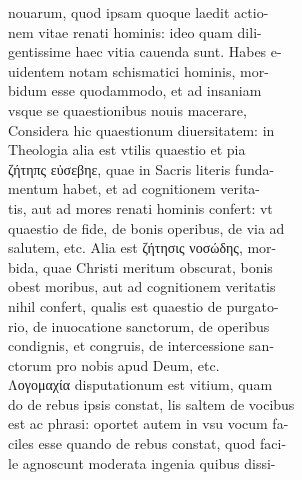 \documentclass{article}
\begin{document}
\begin{pages}
                nouarum, quod ipsam quoque laedit actio- \\
                nem vitae renati hominis: ideo quam dili- \\
                gentissime haec vitia cauenda sunt. Habes e- \\
                uidentem notam schismatici hominis, mor- \\
                bidum esse quodammodo, et ad insaniam \\
                vsque se quaestionibus nouis macerare, \\
                Considera hic quaestionum diuersitatem: in \\
                Theologia alia est vtilis quaestio et pia \\
                ζήτηπς εὐσεβηε, quae in Sacris literis funda- \\
                mentum habet, et ad cognitionem verita- \\
                tis, aut ad mores renati hominis confert: vt \\
                quaestio de fide, de bonis operibus, de via ad \\
                salutem, etc. Alia est ζήτησις νοσώδης, mor- \\
                bida, quae Christi meritum obscurat, bonis \\
                obest moribus, aut ad cognitionem veritatis \\
                nihil confert, qualis est quaestio de purgato- \\
                rio, de inuocatione sanctorum, de operibus \\
                condignis, et congruis, de intercessione san- \\
                ctorum pro nobis apud Deum, etc. \\
                Λογομαχία disputationum est vitium, quam \\
                do de rebus ipsis constat, lis saltem de vocibus \\
                est ac phrasi: oportet autem in vsu vocum fa- \\
                ciles esse quando de rebus constat, quod faci- \\
                le agnoscunt moderata ingenia quibus dissi- \\

\end{pages}
\end{document}
